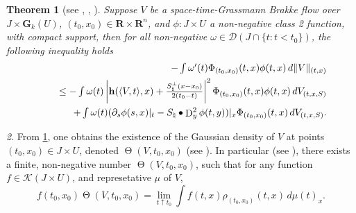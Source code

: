 \documentclass{article}
\theoremstyle{plain}
\newtheorem{theorem}{Theorem}[section]
\theoremstyle{definition}
\theoremstyle{plain}
\theoremstyle{remark}
\newtheorem{propparagraph}[theorem]{}
\theoremstyle{remark}
\theoremstyle{plain}
\DeclareMathOperator{\D}{D}
\DeclareMathOperator{\GDensity}{\Theta}
\begin{document}
\begin{theorem}[see , , ]\label{prop:monotonicity formula}
    Suppose $V$ be a space-time-Grassmann Brakke flow over $J \times \mathbf{G}_{k} (U)$, $(t_{0}, x_{0}) \in \mathbf{R} \times \mathbf{R}^{n}$, and $\phi \colon J \times U$ a non-negative class 2 function, with compact support, then for all non-negative $\omega \in \mathscr{D} (J \cap \{ t \colon  t < t_{0} \})$, the following inequality holds
    \begin{eqnarray*}
        && \textstyle - \int \omega'(t) \Phi_{(t_{0}, x_{0})} (t, x) \phi (t, x) \, d \| V \|_{(t, x)} \\
        && \textstyle\hspace{0.5cm} \leq - \int \omega (t) \left| \mathbf{h} (\langle V, t \rangle, x) + \frac{S^{\perp}_{\natural} (x - x_{0})}{2 (t_{0} - t)} \right|^{2} \Phi_{(t_{0}, x_{0})} (t, x) \phi(t,x) \, d V_{(t, x, S)} \\
        &&\textstyle \hspace{1cm} + \int \omega (t) (\partial_{s} \phi (s, x )|_{t} - S_{\natural} \bullet \D^{2}_{y} \phi (t, y))|_{x} \Phi_{(t_{0}, x_{0})} (t, x) \, d V_{(t, x, S)}.
    \end{eqnarray*}
\end{theorem}

\begin{propparagraph}
    From \ref{prop:monotonicity formula}, one obtains the existence of the Gaussian density of $V$ at points $(t_{0}, x_{0}) \in J \times U$, denoted $\GDensity(V, t_{0}, x_{0})$ (see \cite[4.16(4)]{EckerMCFBook}).
    In particular (see \cite[(4.17)]{EckerMCFBook}), there exists a finite, non-negative number $\GDensity (V, t_{0}, x_{0})$, such that for any function $f \in \mathscr{K} (J \times U)$, and represetative $\mu$ of $V$,
    \begin{equation*}
        f (t_{0}, x_{0}) \GDensity (V, t_{0}, x_{0}) =\textstyle \lim\limits_{t \uparrow t_{0}} \int f (t, x) \rho_{(t_{0}, x_{0})} (t, x) \, d \mu(t)_{x}.
    \end{equation*}
\end{propparagraph}
\end{document}

